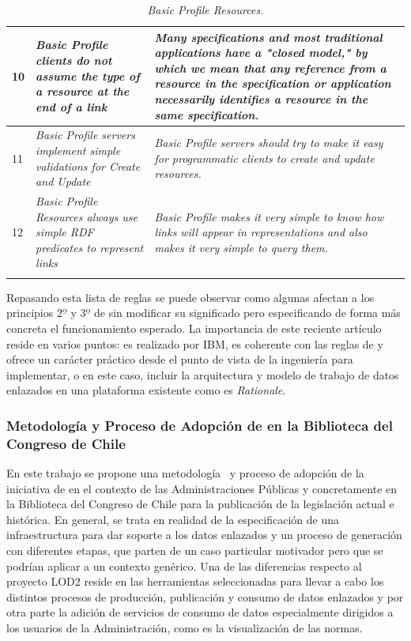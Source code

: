 \begin{longtable}[c]{|l|p{6.5cm}|p{7.5cm}|}
  10 &  \textit{Basic Profile clients do not assume the type of a resource at the end of a link} &   \textit{Many specifications and most traditional applications have a "closed model," by which we mean that any reference from a resource in the specification or application necessarily identifies a resource in the same specification.} \\ \hline
  11 &  \textit{Basic Profile servers implement simple validations for Create and Update} &   \textit{Basic Profile servers should try to make it easy for programmatic clients to create and update resources.} \\ \hline
  12 &  \textit{Basic Profile Resources always use simple RDF predicates to represent links} &   \textit{Basic Profile makes it very simple to know how links will appear in representations and also makes it very simple to query them.} \\ \hline
\hline
\caption{\textit{Basic Profile Resources.}}\label{table:basic-ibm}\\    
\end{longtable}

Repasando esta lista de reglas se puede observar como algunas afectan a los principios $2º$ y $3º$ de \linkeddata sin
modificar su significado pero especificando de forma más concreta el funcionamiento esperado. La importancia
de este reciente artículo reside en varios puntos: es realizado por IBM, es coherente con las reglas de \linkeddata y
ofrece un carácter práctico desde el punto de vista de la ingeniería para implementar, o en este caso, incluir
la arquitectura y modelo de trabajo de datos enlazados en una plataforma existente como es \textit{Rationale}.


\subsubsection{Metodología y Proceso de Adopción de \linkeddata en la Biblioteca del Congreso de Chile}
En este trabajo se propone una metodología~\cite{DBLP:conf/i-semantics/Cifuentes-SilvaSG11,methodologyCaepia2011} y proceso de adopción de la iniciativa de \linkeddata en el contexto
de las Administraciones Públicas y concretamente en la Biblioteca del Congreso de Chile para la publicación
de la legislación actual e histórica. En general, se trata en realidad de la especificación de una infraestructura
para dar soporte a los datos enlazados y un proceso de generación con diferentes etapas, que parten de un
caso particular motivador pero que se podrían aplicar a un contexto genérico. Una de las diferencias respecto 
al proyecto LOD2 reside en las herramientas seleccionadas para llevar a cabo los distintos procesos de producción, publicación y consumo de datos enlazados y por otra parte la
adición de servicios de consumo de datos especialmente dirigidos a los usuarios de la Administración, como es la visualización
de las normas.

